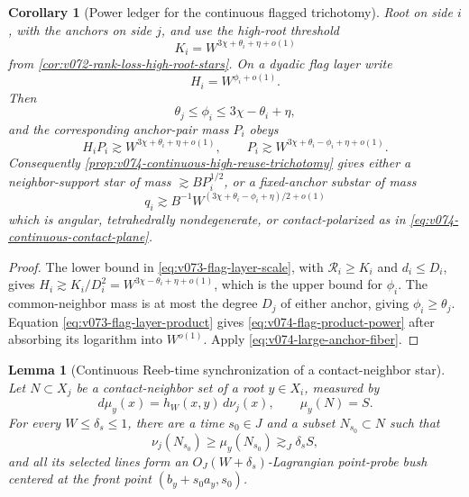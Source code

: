 \documentclass[10pt]{article}
\newtheorem{lemma}[theorem]{Lemma}
\newtheorem{corollary}[theorem]{Corollary}
\begin{document}
\begin{corollary}[Power ledger for the continuous flagged trichotomy]
\label{cor:v074-continuous-flag-power-ledger}
Root on side \(i\), with the anchors on side \(j\), and use the high-root threshold
\[
K_i=W^{3\chi+\theta_i+\eta+o(1)}
\]
from \cref{cor:v072-rank-loss-high-root-stars}.  On a dyadic flag layer write
\[
H_i=W^{\phi_i+o(1)}.
\]
Then
\begin{equation}
\label{eq:v074-flag-exponent-range}
\boxed{
\theta_j
\le\phi_i
\le3\chi-\theta_i+\eta,
}
\end{equation}
and the corresponding anchor-pair mass \(P_i\) obeys
\begin{equation}
\label{eq:v074-flag-product-power}
\boxed{
H_iP_i
\gtrsim W^{3\chi+\theta_i+\eta+o(1)},
\qquad
P_i
\gtrsim W^{3\chi+\theta_i-\phi_i+\eta+o(1)}.
}
\end{equation}
Consequently \cref{prop:v074-continuous-high-reuse-trichotomy} gives either a neighbor-support
star of mass \(\gtrsim BP_i^{1/2}\), or a fixed-anchor substar of mass
\begin{equation}
\label{eq:v074-fiber-star-power}
\boxed{
q_i
\gtrsim
B^{-1}
W^{(3\chi+\theta_i-\phi_i+\eta)/2+o(1)}
}
\end{equation}
which is angular, tetrahedrally nondegenerate, or contact-polarized as in
\eqref{eq:v074-continuous-contact-plane}.
\end{corollary}

\begin{proof}
The lower bound in \eqref{eq:v073-flag-layer-scale}, with
\(\mathcal R_i\ge K_i\) and \(d_i\le D_i\), gives
\(H_i\gtrsim K_i/D_i^2=W^{3\chi-\theta_i+\eta+o(1)}\), which is the upper bound for
\(\phi_i\).  The common-neighbor mass is at most the degree \(D_j\) of either anchor, giving
\(\phi_i\ge\theta_j\).  Equation \eqref{eq:v073-flag-layer-product} gives
\eqref{eq:v074-flag-product-power} after absorbing its logarithm into \(W^{o(1)}\).
Apply \eqref{eq:v074-large-anchor-fiber}.
\end{proof}

\begin{lemma}[Continuous Reeb-time synchronization of a contact-neighbor star]
\label{lem:v075-continuous-star-time-bush}
Let \(N\subset X_j\) be a contact-neighbor set of a root \(y\in X_i\), measured by
\[
d\mu_y(x)=h_W(x,y)\,d\nu_j(x),
\qquad
\mu_y(N)=S.
\]
For every \(W\le\delta_s\le1\), there are a time \(s_0\in J\) and a subset
\(N_{s_0}\subset N\) such that
\begin{equation}
\label{eq:v075-time-bush-mass}
\boxed{
\nu_j(N_{s_0})
\ge\mu_y(N_{s_0})
\gtrsim_J\delta_sS,
}
\end{equation}
and all its selected lines form an
\(O_J(W+\delta_s)\)-Lagrangian point-probe bush centered at the front point
\((b_y+s_0a_y,s_0)\).
\end{lemma}
\end{document}
